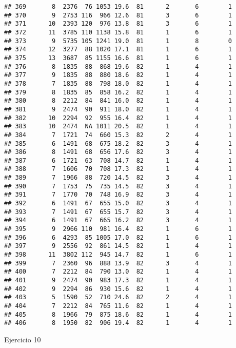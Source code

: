 \documentclass{article}\usepackage[]{graphicx}\usepackage[]{color}
\makeatletter
\newenvironment{kframe}{%
 \def\at@end@of@kframe{}%
 \ifinner\ifhmode%
  \def\at@end@of@kframe{\end{minipage}}%
  \begin{minipage}{\columnwidth}%
 \fi\fi%
 \def\FrameCommand##1{\hskip\@totalleftmargin \hskip-\fboxsep
 \colorbox{shadecolor}{##1}\hskip-\fboxsep
     \hskip-\linewidth \hskip-\@totalleftmargin \hskip\columnwidth}%
 \MakeFramed {\advance\hsize-\width
   \@totalleftmargin\z@ \linewidth\hsize
   \@setminipage}}%
 {\par\unskip\endMakeFramed%
 \at@end@of@kframe}
\newenvironment{knitrout}{}{} %
\makeatother
\begin{document}
\begin{knitrout}
\begin{kframe}
\begin{verbatim}
## 369       8  2376  76 1053 19.6  81      2       6        1
## 370       9  2753 116  966 12.6  81      3       6        1
## 371      10  2393 120  976 13.8  81      3       6        1
## 372      11  3785 110 1138 15.8  81      1       6        1
## 373       9  5735 105 1241 19.0  81      1       8        0
## 374      12  3277  88 1020 17.1  81      1       6        1
## 375      13  3687  85 1155 16.6  81      1       6        1
## 376       8  1835  88  868 19.6  82      1       4        1
## 377       9  1835  88  880 18.6  82      1       4        1
## 378       7  1835  88  798 18.0  82      1       4        1
## 379       8  1835  85  858 16.2  82      1       4        1
## 380       8  2212  84  841 16.0  82      1       4        1
## 381       9  2474  90  911 18.0  82      1       4        1
## 382      10  2294  92  955 16.4  82      1       4        1
## 383      10  2474  NA 1011 20.5  82      1       4        1
## 384       7  1721  74  660 15.3  82      2       4        1
## 385       6  1491  68  675 18.2  82      3       4        1
## 386       8  1491  68  656 17.6  82      3       4        1
## 387       6  1721  63  708 14.7  82      1       4        1
## 388       7  1606  70  708 17.3  82      1       4        1
## 389       7  1966  88  720 14.5  82      3       4        1
## 390       7  1753  75  735 14.5  82      3       4        1
## 391       7  1770  70  748 16.9  82      3       4        1
## 392       6  1491  67  655 15.0  82      3       4        1
## 393       7  1491  67  655 15.7  82      3       4        1
## 394       6  1491  67  665 16.2  82      3       4        1
## 395       9  2966 110  981 16.4  82      1       6        1
## 396       6  4293  85 1005 17.0  82      1       6        1
## 397       9  2556  92  861 14.5  82      1       4        1
## 398      11  3802 112  945 14.7  82      1       6        1
## 399       7  2360  96  888 13.9  82      3       4        1
## 400       7  2212  84  790 13.0  82      1       4        1
## 401       9  2474  90  983 17.3  82      1       4        1
## 402       9  2294  86  930 15.6  82      1       4        1
## 403       5  1590  52  710 24.6  82      2       4        1
## 404       7  2212  84  765 11.6  82      1       4        1
## 405       8  1966  79  875 18.6  82      1       4        1
## 406       8  1950  82  906 19.4  82      1       4        1
\end{verbatim}
\end{kframe}
\end{knitrout}
Ejercicio 10\\
\end{document}
